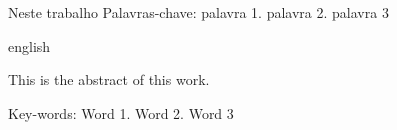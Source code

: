 \begin{resumo}
\noindent
 
Neste trabalho
 \vspace{0.2cm}   
Palavras-chave: palavra 1. palavra 2. palavra 3
 
\end{resumo}
 
\begin{resumo}[Abstract]	
\begin{otherlanguage*}{english}
\noindent 
 
This is the abstract of this work.
 
\vspace{0.2cm}
Key-words: Word 1. Word 2. Word 3
\end{otherlanguage*}
\end{resumo}

